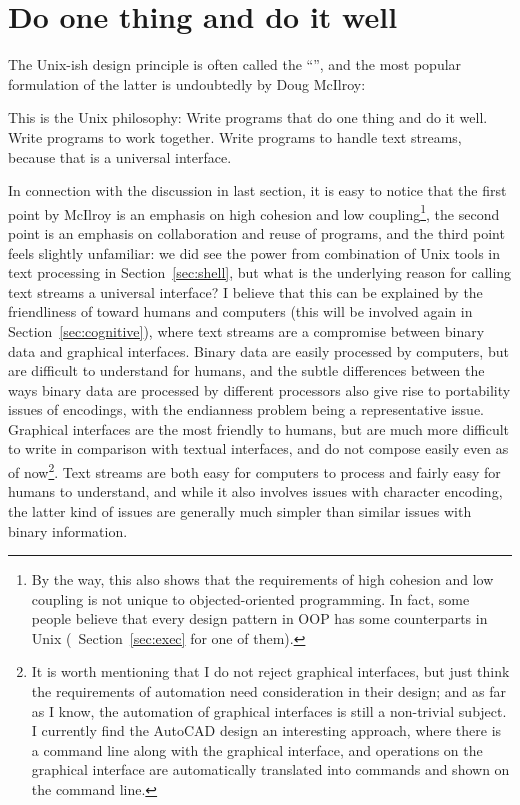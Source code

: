 \section{Do one thing and do it well}\label{sec:mcilroy}

The Unix-ish design principle is often called the ``'',
and the most popular formulation of the latter is undoubtedly
by Doug McIlroy:
\begin{quoting}
	This is the Unix philosophy:  Write programs that do one thing and
	do it well.  Write programs to work together.  Write programs to
	handle text streams, because that is a universal interface.
\end{quoting}

In connection with the discussion in last section, it is easy to notice
that the first point by McIlroy is an emphasis on high cohesion and low
coupling\footnote{By the way, this also shows that the requirements of high
cohesion and low coupling is not unique to objected-oriented programming.
In fact, some people believe that every design pattern
in OOP has some counterparts in Unix (\cf~Section~\ref{sec:exec} for one of
them).}, the second point is an emphasis on collaboration and reuse of
programs, and the third point feels slightly unfamiliar: we did see the power
from combination of Unix tools in text processing in Section~\ref{sec:shell},
but what is the underlying reason for calling text streams a universal
interface?  I believe that this can be explained by the friendliness of
 toward humans and computers (this will
be involved again in Section~\ref{sec:cognitive}), where text streams are a
compromise between binary data and graphical interfaces.  Binary data are easily
processed by computers, but are difficult to understand for humans, and the
subtle differences between the ways binary data are processed by different
processors also give rise to portability issues of encodings, with the
endianness problem being a representative issue.  Graphical interfaces are
the most friendly to humans, but are much more difficult to write in comparison
with textual interfaces, and do not compose easily even as of now\footnote{It is
worth mentioning that I do not reject graphical interfaces, but just think the
requirements of automation need consideration in their design; and as far
as I know, the automation of graphical interfaces is still a non-trivial
subject.  I currently find the AutoCAD design an interesting approach, where
there is a command line along with the graphical interface, and operations on
the graphical interface are automatically translated into commands and shown
on the command line.}.  Text streams are both easy for computers to process
and fairly easy for humans to understand, and while it also involves issues
with character encoding, the latter kind of issues are generally
much simpler than similar issues with binary information.

